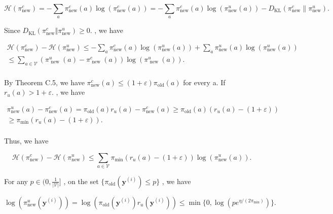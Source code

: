 \documentclass[
  10
]{article}
\begin{document}
\[
\mathcal {H} (\pi_ {\mathrm{new}} ^ {c}) = - \sum_ {a} \pi_ {\mathrm{new}} ^ {c} (a) \log (\pi_ {\mathrm{new}} ^ {c} (a)) = - \sum_ {a} \pi_ {\mathrm{new}} ^ {c} (a) \log (\pi_ {\mathrm{new}} ^ {u} (a)) - D _ {\mathrm{KL}} (\pi_ {\mathrm{new}} ^ {c} \| \pi_ {\mathrm{new}} ^ {u}).
\]

Since
\(D _ { \mathrm { K L } } ( \pi _ { \mathrm { n e w } } ^ { c } \Vert \pi _ { \mathrm { n e w } } ^ { u } ) \geq 0 .\)
, we have

\[
\begin{array}{l} \mathcal {H} (\pi_ {\mathrm{new}} ^ {c}) - \mathcal {H} (\pi_ {\mathrm{new}} ^ {u}) \leq - \sum_ {a} \pi_ {\mathrm{new}} ^ {c} (a) \log (\pi_ {\mathrm{new}} ^ {u} (a)) + \sum_ {a} \pi_ {\mathrm{new}} ^ {u} (a) \log (\pi_ {\mathrm{new}} ^ {u} (a)) \\ \leq \sum_ {a \in \mathcal {V}} (\pi_ {\text { new }} ^ {u} (a) - \pi_ {\text { new }} ^ {c} (a)) \log (\pi_ {\text { new }} ^ {u} (a)). \\ \end{array}
\]

By Theorem C.5, we have
\(\pi _ { \mathrm { n e w } } ^ { c } ( a ) \leq ( 1 + \varepsilon ) \pi _ { \mathrm { o l d } } ( a )\)
for every a. If \(r _ { u } ( a ) > 1 + \varepsilon .\) , we have

\[
\begin{array}{l} \pi_ {\mathrm{new}} ^ {u} (a) - \pi_ {\mathrm{new}} ^ {c} (a) = \pi_ {\mathrm{old}} (a) r _ {u} (a) - \pi_ {\mathrm{new}} ^ {c} (a) \geq \pi_ {\mathrm{old}} (a) (r _ {u} (a) - (1 + \varepsilon)) \\ \geq \pi_ {\min} (r _ {u} (a) - (1 + \varepsilon)). \\ \end{array}
\]

Thus, we have

\[
\mathcal {H} (\pi_ {\mathrm{new}} ^ {c}) - \mathcal {H} (\pi_ {\mathrm{new}} ^ {u}) \leq \sum_ {a \in \mathcal {V}} \pi_ {\min} (r _ {u} (a) - (1 + \varepsilon)) \log (\pi_ {\mathrm{new}} ^ {u} (a)). \tag {30}
\]

For any \(p \in ( 0 , \frac { 1 } { | \mathcal { V } | } ]\) , on the
set
\(\{ \pi _ { \mathrm { o l d } } ( \mathbf { y } ^ { ( i ) } ) \leq p \}\)
, we have

\[
\log (\pi_ {\mathrm{new}} ^ {u} (\mathbf {y} ^ {(i)})) = \log (\pi_ {\mathrm{old}} (\mathbf {y} ^ {(i)}) r _ {u} (\mathbf {y} ^ {(i)})) \leq \min \{0, \log (p e ^ {\eta / (2 \pi_ {\mathrm{min}})}) \}.
\]
\end{document}
